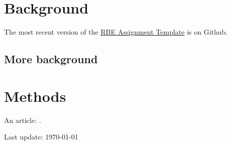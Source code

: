 \documentclass{RBEassignment}
\begin{document}
\def\RBEtitle{Assignment\\Template}
\def\RBEcourse{RBE-001 Generic RBE Course}
\def\RBEsemester{Spring 2022}
\def\RBEauthor{Daniel Montrallo Flickinger, PhD}
\def\RBEnumber{0}
\def\RBEdue{2022-01-01 @ 00:00 UTC}



\RBEassignmentheader{}



\section{Background}


The most recent version of the \href{https://github.com/dmflickinger/RBE550-assignment-template}{RBE Assignment Template} is on Github.  

\lipsum[2]

\subsection{More background}

\lipsum[3]

\section{Methods}

\lipsum[4]

An article: \cite{WSJrobotRescue}.






\printurls


\vspace{6em}
\begin{center}
{\small \sffamily Last update: \today}
\end{center}
\end{document}
